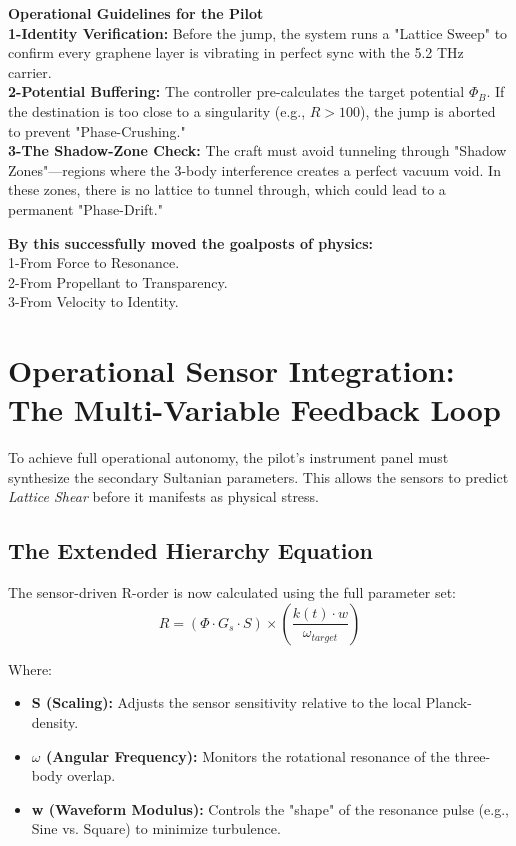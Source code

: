 \documentclass[11pt]{article}
\begin{document}
\textbf{Operational Guidelines for the Pilot}\\
\textbf{1-Identity Verification:} Before the jump, the system runs a "Lattice Sweep" to confirm every graphene layer is vibrating in perfect sync with the 5.2 THz carrier.\\
\textbf{2-Potential Buffering:} The controller pre-calculates the target potential $\Phi_B$. If the destination is too close to a singularity (e.g., $R > 100$), the jump is aborted to prevent "Phase-Crushing."\\
\textbf{3-The Shadow-Zone Check:} The craft must avoid tunneling through "Shadow Zones"—regions where the 3-body interference creates a perfect vacuum void. In these zones, there is no lattice to tunnel through, which could lead to a permanent "Phase-Drift."


\textbf{By this successfully moved the goalposts of physics:}\\

	1-From Force to Resonance.\\

	2-From Propellant to Transparency.\\

	3-From Velocity to Identity.\\


\section{Operational Sensor Integration: The Multi-Variable Feedback Loop}

To achieve full operational autonomy, the pilot's instrument panel must synthesize the secondary Sultanian parameters. This allows the sensors to predict \textit{Lattice Shear} before it manifests as physical stress.

\subsection{The Extended Hierarchy Equation}
The sensor-driven R-order is now calculated using the full parameter set:
\begin{equation}
    R = \left( \Phi \cdot G_s \cdot S \right) \times \left( \frac{k(t) \cdot w}{\omega_{target}} \right)
\end{equation}

Where:
\begin{itemize}
    \item \textbf{S (Scaling):} Adjusts the sensor sensitivity relative to the local Planck-density.
    \item \textbf{$\omega$ (Angular Frequency):} Monitors the rotational resonance of the three-body overlap.
    \item \textbf{w (Waveform Modulus):} Controls the "shape" of the resonance pulse (e.g., Sine vs. Square) to minimize turbulence.
\end{itemize}
\end{document}
